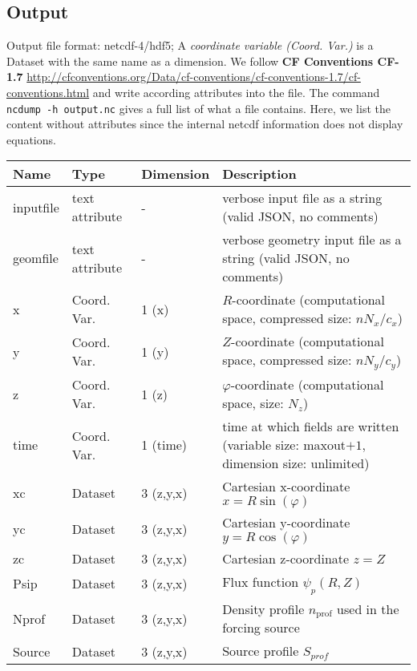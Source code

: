 \subsection{Output} \label{sec:output_file}
Output file format: netcdf-4/hdf5; A \textit{coordinate variable (Coord. Var.)} is a Dataset with the same name as a dimension.
We follow \textbf{CF Conventions CF-1.7}
\url{http://cfconventions.org/Data/cf-conventions/cf-conventions-1.7/cf-conventions.html}
and write according attributes into the file.
The command \texttt{ncdump -h output.nc} gives a full list of what a file contains.
Here, we list the content without attributes
since the internal netcdf information does not display equations.
%
\begin{longtable}{lll>{\RaggedRight}p{7cm}}
\toprule
\rowcolor{gray!50}\textbf{Name} &  \textbf{Type} & \textbf{Dimension} & \textbf{Description}  \\ \midrule
inputfile  &     text attribute & - & verbose input file as a string (valid JSON, no comments) \\
geomfile   &     text attribute & - & verbose geometry input file as a string (valid JSON, no comments) \\
x                & Coord. Var. & 1 (x) & $R$-coordinate (computational space, compressed size: $nN_x/c_x$)\\
y                & Coord. Var. & 1 (y) & $Z$-coordinate (computational space, compressed size: $nN_y/c_y$)\\
z                & Coord. Var. & 1 (z) & $\varphi$-coordinate (computational space, size: $N_z$) \\
time             & Coord. Var. & 1 (time)& time at which fields are written (variable size: maxout$+1$, dimension size: unlimited) \\
xc           & Dataset & 3 (z,y,x) & Cartesian x-coordinate $x=R\sin(\varphi)$ \\
yc           & Dataset & 3 (z,y,x) & Cartesian y-coordinate $y=R\cos(\varphi)$\\
zc           & Dataset & 3 (z,y,x) & Cartesian z-coordinate $z=Z$ \\
Psip             & Dataset & 3 (z,y,x) & Flux function $\psi_p(R,Z)$ \\
Nprof            & Dataset & 3 (z,y,x) & Density profile $n_\text{prof}$ used in the forcing source \\
Source           & Dataset & 3 (z,y,x) & Source profile $S_{prof}$\\

\end{longtable}
